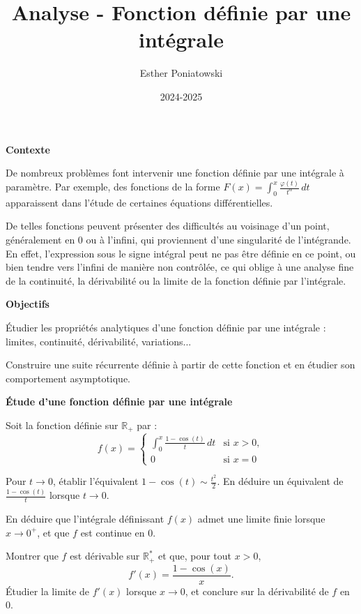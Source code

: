 \documentclass[10pt,a4paper]{article}
\title{Analyse - Fonction définie par une intégrale}
\author{Esther Poniatowski}
\date{2024-2025}
\begin{document}
\textbf{Contexte}

De nombreux problèmes font intervenir une fonction définie par une intégrale à paramètre. Par
exemple, des fonctions de la forme \( \displaystyle F(x) = \int_0^x \frac{\varphi(t)}{t^\alpha} \,
dt \) apparaissent dans l'étude de certaines équations différentielles.

De telles fonctions peuvent présenter des difficultés au voisinage d'un point, généralement en 0 ou
à l'infini, qui proviennent d'une singularité de l'intégrande. En effet, l'expression sous le signe
intégral peut ne pas être définie en ce point, ou bien tendre vers l'infini de manière non
contrôlée, ce qui oblige à une analyse fine de la continuité, la dérivabilité ou la limite de la
fonction définie par l'intégrale.

\bigskip
\textbf{Objectifs}

Étudier les propriétés analytiques d'une fonction définie par une intégrale : limites, continuité,
dérivabilité, variations...

Construire une suite récurrente définie à partir de cette fonction et en étudier son comportement
asymptotique.

\bigskip

\textbf{Étude d'une fonction définie par une intégrale}

Soit la fonction définie sur \( \mathbb{R}_+ \) par :
\[
f(x) =
\begin{cases}
\displaystyle \int_0^x \frac{1 - \cos(t)}{t} \, dt & \text{si } x > 0, \\
0 & \text{si } x = 0
\end{cases}
\]

\q Pour \( t \to 0 \), établir l'équivalent \( 1 - \cos(t) \sim \frac{t^2}{2} \). En déduire un
équivalent de \( \frac{1 - \cos(t)}{t} \) lorsque \( t \to 0 \).

\q En déduire que l'intégrale définissant \( f(x) \) admet une limite finie lorsque \( x \to 0^+ \),
et que \( f \) est continue en \( 0 \).

\q Montrer que \( f \) est dérivable sur \( \mathbb{R}_+^* \) et que, pour tout \( x > 0 \),
\[
f'(x) = \frac{1 - \cos(x)}{x}.
\]
Étudier la limite de \( f'(x) \) lorsque \( x \to 0 \), et conclure sur la dérivabilité de \( f \)
en \( 0 \).
\end{document}
